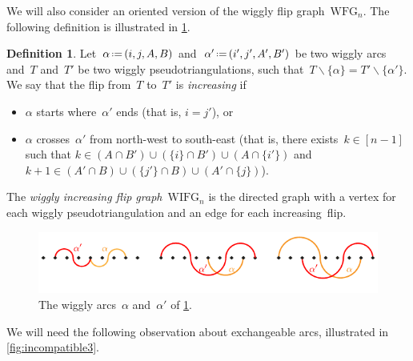 \documentclass{amsart}
\theoremstyle{definition}
\newtheorem{definition}[theorem]{Definition}
\newcommand{\ssm}{\smallsetminus} %
\newcommand{\eqdef}{\mbox{\,\raisebox{0.2ex}{\scriptsize\ensuremath{\mathrm:}}\ensuremath{=}\,}} %
\newcommand{\darkblue}{\color{darkblue}} %
\newcommand{\defn}[1]{\textsl{\darkblue #1}} %
\newcommand{\wigglyFlipGraph}{\mathrm{WFG}} %
\newcommand{\wigglyIncreasingFlipGraph}{\mathrm{WIFG}} %
\begin{document}
We will also consider an oriented version of the wiggly flip graph~$\wigglyFlipGraph_n$.
The following definition is illustrated in \cref{fig:incompatible2}.

\begin{definition}
\label{def:wigglyIncreasingFlipGraph}
Let~$\alpha \eqdef (i, j, A, B)$ and~$\alpha' \eqdef (i', j', A', B')$ be two wiggly arcs and~$T$ and~$T'$ be two wiggly pseudotriangulations, such that~$T \ssm \{\alpha\} = T' \ssm \{\alpha'\}$.
We say that the flip from~$T$ to~$T'$ is \defn{increasing} if 
\begin{itemize}
\item $\alpha$ starts where~$\alpha'$ ends (that is, $i = j'$), or 
\item $\alpha$ crosses~$\alpha'$ from north-west to south-east (that is, there exists~$k \in [n-1]$ such that $k \in (A \cap B') \cup (\{i\} \cap B') \cup (A \cap \{i'\})$ and~$k+1 \in (A' \cap B) \cup (\{j'\} \cap B) \cup (A' \cap \{j\})$).
\end{itemize}
The \defn{wiggly increasing flip graph}~$\wigglyIncreasingFlipGraph_n$ is the directed graph with a vertex for each wiggly pseudotriangulation and an edge for each increasing~flip.
%
\begin{figure}
\centerline{\includegraphics[scale=1.3]{incompatible2}}
\caption{The wiggly arcs~$\alpha$ and~$\alpha'$ of \cref{def:wigglyIncreasingFlipGraph}.}
\label{fig:incompatible2}
\end{figure}
\end{definition}

\pagebreak
We will need the following observation about exchangeable arcs, illustrated in \cref{fig:incompatible3}.
\end{document}
